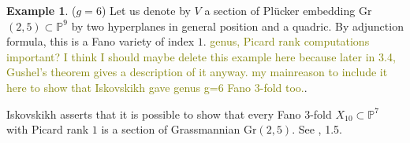 \documentclass[11pt]{amsart}
\theoremstyle{plain}
\theoremstyle{definition}
\newtheorem{example}[theorem]{Example}
\theoremstyle{expl}
\begin{document}
\begin{example}
        ($g=6$) Let us denote by $V$ a section of Pl\"{u}cker embedding Gr$(2,5) \subset \mathbb{P}^9$ by two hyperplanes in general position and a quadric. By adjunction formula, this is a Fano variety of index $1$. \textcolor{olive}{genus, Picard rank computations important? I think I should maybe delete this example here because later in 3.4, Gushel's theorem gives a description of it anyway. my mainreason to include it here to show that Iskovskikh gave genus g=6 Fano $3$-fold too.}.
\end{example}
Iskovskikh asserts that it is possible to show that every Fano $3$-fold $X_{10} \subset \mathbb{P}^7$ with Picard rank $1$ is a section of Grassmannian Gr$(2,5)$. See \cite{Isk78}, 1.5.\\
\end{document}
